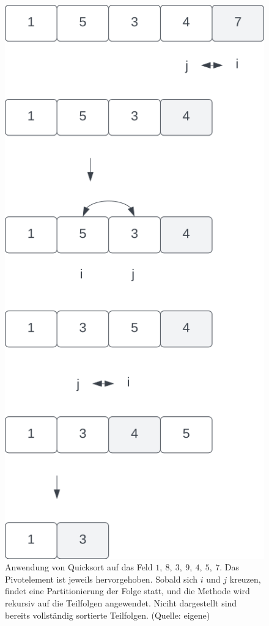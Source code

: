 \begin{figure}
\begin{center}
        \includegraphics[scale=0.3]{chapters/Sortierverfahren/img/quicksort2}
        \caption{Anwendung von Quicksort auf das Feld $1,\ 8,\ 3,\ 9,\ 4,\ 5,\ 7$. Das Pivotelement ist jeweils hervorgehoben. Sobald sich $i$ und $j$ kreuzen, findet eine Partitionierung der Folge statt, und die Methode wird rekursiv auf die Teilfolgen angewendet. Niciht dargestellt sind bereits vollständig sortierte Teilfolgen. (Quelle: eigene)}
        \label{fig:quicksort}
    \end{center}
\end{figure}


